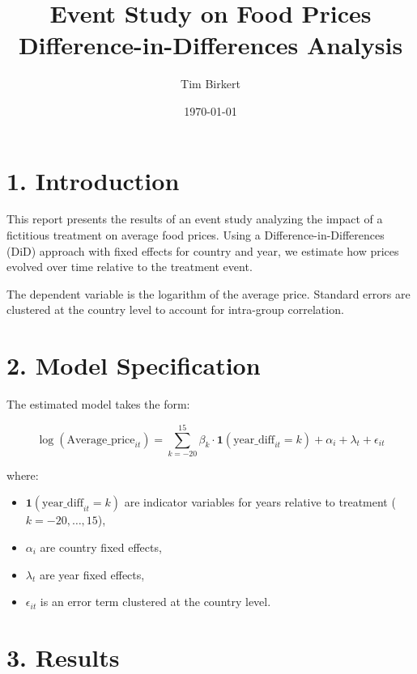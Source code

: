 \documentclass[a4paper,12pt]{article}
\title{Event Study on Food Prices \\ \large Difference-in-Differences Analysis}
\author{Tim Birkert}
\date{\today}
\begin{document}
\maketitle

\section*{1. Introduction}

This report presents the results of an event study analyzing the impact of a fictitious treatment on average food prices. Using a Difference-in-Differences (DiD) approach with fixed effects for country and year, we estimate how prices evolved over time relative to the treatment event.

The dependent variable is the logarithm of the average price. Standard errors are clustered at the country level to account for intra-group correlation.

\vspace{1em}

\section*{2. Model Specification}

The estimated model takes the form:

\[
\log(\text{Average\_price}_{it}) = \sum_{k=-20}^{15} \beta_k \cdot \mathbf{1}(\text{year\_diff}_{it} = k) + \alpha_i + \lambda_t + \epsilon_{it}
\]

where:
\begin{itemize}
    \item $\mathbf{1}(\text{year\_diff}_{it} = k)$ are indicator variables for years relative to treatment ($k = -20, \ldots, 15$),
    \item $\alpha_i$ are country fixed effects,
    \item $\lambda_t$ are year fixed effects,
    \item $\epsilon_{it}$ is an error term clustered at the country level.
\end{itemize}

\vspace{1em}
\newpage

\section*{3. Results}
\end{document}
